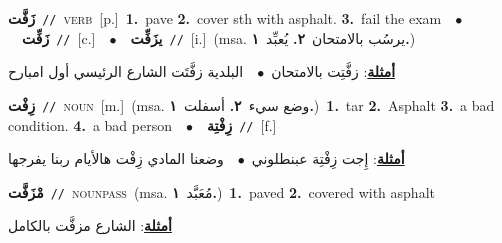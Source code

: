 \documentclass[10pt,a4paper,twoside]{article} %
\begin{document}
\begin{multicols}{2}
{\setlength\topsep{0pt}\textbf{\foreignlanguage{arabic}{زَفَّت}}\ {\color{gray}\texttt{//}\color{black}}\ \textsc{verb}\ [p.]\ \textbf{1.}~pave  \textbf{2.}~cover sth with asphalt.  \textbf{3.}~fail the exam\ \ $\bullet$\ \ \setlength\topsep{0pt}\textbf{\foreignlanguage{arabic}{زَفِّت}}\ {\color{gray}\texttt{//}\color{black}}\ [c.]\ \ $\bullet$\ \ \setlength\topsep{0pt}\textbf{\foreignlanguage{arabic}{يزَفِّت}}\ {\color{gray}\texttt{//}\color{black}}\ [i.]\ \color{gray}(msa. \foreignlanguage{arabic}{يرسُب بالامتحان}~\foreignlanguage{arabic}{\textbf{٢.}}  \foreignlanguage{arabic}{يُعبِّد}~\foreignlanguage{arabic}{\textbf{١.}})\color{black}\  \begin{flushright}\color{gray}\foreignlanguage{arabic}{\textbf{\underline{\foreignlanguage{arabic}{أمثلة}}}: زفَّتِت بالامتحان\ $\bullet$\ \  البلدية زفَّتَت الشارع الرئيسي أول امبارح}\end{flushright}\color{black}} \vspace{2mm}

{\setlength\topsep{0pt}\textbf{\foreignlanguage{arabic}{زِفْت}}\ {\color{gray}\texttt{//}\color{black}}\ \textsc{noun}\ [m.]\ \color{gray}(msa. \foreignlanguage{arabic}{وضع سيء}~\foreignlanguage{arabic}{\textbf{٢.}}  \foreignlanguage{arabic}{أسفلت}~\foreignlanguage{arabic}{\textbf{١.}})\color{black}\ \textbf{1.}~tar  \textbf{2.}~Asphalt  \textbf{3.}~a bad condition.  \textbf{4.}~a bad person\ \ $\bullet$\ \ \setlength\topsep{0pt}\textbf{\foreignlanguage{arabic}{زِفْتِة}}\ {\color{gray}\texttt{//}\color{black}}\ [f.]\  \begin{flushright}\color{gray}\foreignlanguage{arabic}{\textbf{\underline{\foreignlanguage{arabic}{أمثلة}}}: إِجت زِفْتِة عبنطلوني\ $\bullet$\ \  وضعنا المادي زِفْت هالأيام ربنا يفرجها}\end{flushright}\color{black}} \vspace{2mm}

{\setlength\topsep{0pt}\textbf{\foreignlanguage{arabic}{مْزَفَّت}}\ {\color{gray}\texttt{//}\color{black}}\ \textsc{noun\textunderscore pass}\ \color{gray}(msa. \foreignlanguage{arabic}{مُعَبَّد}~\foreignlanguage{arabic}{\textbf{١.}})\color{black}\ \textbf{1.}~paved  \textbf{2.}~covered with asphalt\  \begin{flushright}\color{gray}\foreignlanguage{arabic}{\textbf{\underline{\foreignlanguage{arabic}{أمثلة}}}: الشارع مزفَّت بالكامل}\end{flushright}\color{black}} \vspace{2mm}


\end{multicols}
\end{document}
